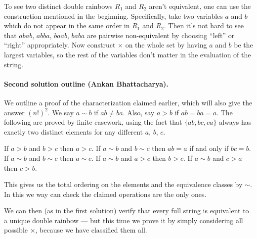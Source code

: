 \documentclass[11pt]{scrartcl}
\begin{document}
To see two distinct double rainbows $R_1$ and $R_2$ aren't equivalent,
one can use the construction mentioned in the beginning.
Specifically, take two variables $a$ and $b$ which do not
appear in the same order in $R_1$ and $R_2$.
Then it's not hard to see that $abab$, $abba$, $baab$, $baba$
are pairwise non-equivalent by choosing ``left'' or ``right'' appropriately.
Now construct $\times$ on the whole set
by having $a$ and $b$ be the largest variables,
so the rest of the variables don't matter in the evaluation of the string.

\paragraph{Second solution outline (Ankan Bhattacharya).}
We outline a proof of the characterization claimed earlier,
which will also give the answer $(n!)^2$.
We say $a \sim b$ if $ab \neq ba$.
Also, say $a > b$ if $ab = ba = a$.
The following are proved by finite casework,
using the fact that $\{ab, bc, ca\}$ always has exactly
two distinct elements for any different $a$, $b$, $c$.
\begin{itemize}
  \ii If $a > b$ and $b > c$ then $a > c$.
  \ii If $a \sim b$ and $b \sim c$
  then $ab = a$ if and only if $bc = b$.
  \ii If $a \sim b$ and $b \sim c$ then $a \sim c$.
  \ii If $a \sim b$ and $a > c$ then $b > c$.
  \ii If $a \sim b$ and $c > a$ then $c > b$.
\end{itemize}
This gives us the total ordering on the elements
and the equivalence classes by $\sim$.
In this we way can check the claimed operations are the only ones.

We can then (as in the first solution) verify that every full string
is equivalent to a unique double rainbow --- but this
time we prove it by simply considering all possible $\times$,
because we have classified them all.
\pagebreak
\end{document}

